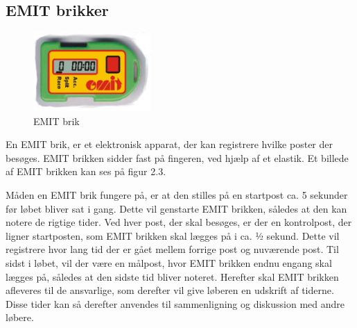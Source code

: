 \subsection{EMIT brikker}
\begin{figure}
  \vspace{5pt}
  \begin{center}
    \includegraphics[width=0.4\textwidth]{billeder/emitbrik}
  \end{center}
  \vspace{-20pt}
  \caption{EMIT brik}
  \vspace{-10pt}
\end{figure}
En EMIT brik, er et elektronisk apparat, der kan registrere hvilke poster der besøges. EMIT brikken sidder fast på fingeren, ved hjælp af et elastik. Et billede af EMIT brikken kan ses på figur 2.3.

Måden en EMIT brik fungere på, er at den stilles på en startpost ca. 5 sekunder før løbet bliver sat i gang. Dette vil genstarte EMIT brikken, således at den kan notere de rigtige tider. 
Ved hver post, der skal besøges, er der en kontrolpost, der ligner startposten, som EMIT brikken skal lægges på i ca. ½ sekund. Dette vil registrere hvor lang tid der er gået mellem forrige post og nuværende post. \newline
Til sidst i løbet, vil der være en målpost, hvor EMIT brikken endnu engang skal lægges på, således at den sidste tid bliver noteret. 
Herefter skal EMIT brikken afleveres til de ansvarlige, som derefter vil give løberen en udskrift af tiderne. Disse tider kan så derefter anvendes til sammenligning og diskussion med andre løbere. \citep{OOK}

